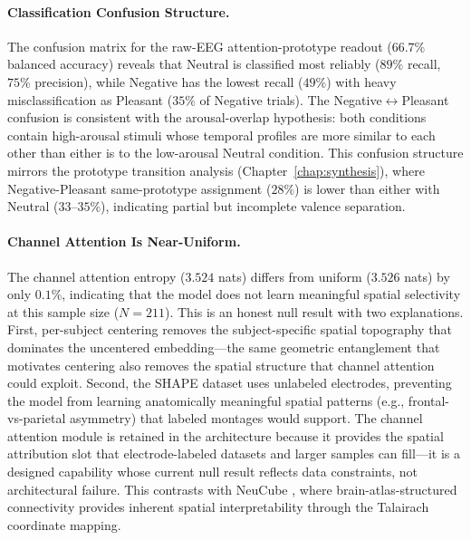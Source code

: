 \paragraph{Classification Confusion Structure.} The confusion matrix for the raw-EEG attention-prototype readout ($66.7\%$ balanced accuracy) reveals that Neutral is classified most reliably ($89\%$ recall, $75\%$ precision), while Negative has the lowest recall ($49\%$) with heavy misclassification as Pleasant ($35\%$ of Negative trials). The Negative$\leftrightarrow$Pleasant confusion is consistent with the arousal-overlap hypothesis: both conditions contain high-arousal stimuli whose temporal profiles are more similar to each other than either is to the low-arousal Neutral condition. This confusion structure mirrors the prototype transition analysis (Chapter~\ref{chap:synthesis}), where Negative-Pleasant same-prototype assignment ($28\%$) is lower than either with Neutral ($33$--$35\%$), indicating partial but incomplete valence separation.

\paragraph{Channel Attention Is Near-Uniform.} The channel attention entropy ($3.524$ nats) differs from uniform ($3.526$ nats) by only $0.1\%$, indicating that the model does not learn meaningful spatial selectivity at this sample size ($N = 211$). This is an honest null result with two explanations. First, per-subject centering removes the subject-specific spatial topography that dominates the uncentered embedding---the same geometric entanglement that motivates centering also removes the spatial structure that channel attention could exploit. Second, the SHAPE dataset uses unlabeled electrodes, preventing the model from learning anatomically meaningful spatial patterns (e.g., frontal-vs-parietal asymmetry) that labeled montages would support. The channel attention module is retained in the architecture because it provides the spatial attribution slot that electrode-labeled datasets and larger samples can fill---it is a designed capability whose current null result reflects data constraints, not architectural failure. This contrasts with NeuCube \cite{kasabov_neucube_2014}, where brain-atlas-structured connectivity provides inherent spatial interpretability through the Talairach coordinate mapping.

